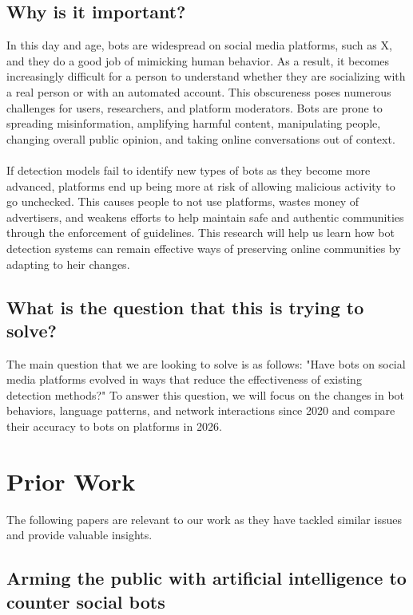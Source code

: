 \subsection{Why is it important?}
    In this day and age, bots are widespread on social media platforms, such as X, and they do a good job of mimicking human behavior. As a result, it becomes increasingly difficult for a person to understand whether they are socializing with a real person or with an automated account. This obscureness poses numerous challenges for users, researchers, and platform moderators. Bots are prone to spreading misinformation, amplifying harmful content, manipulating people, changing overall public opinion, and taking online conversations out of context.
    \\\\
    If detection models fail to identify new types of bots as they become more advanced, platforms end up being more at risk of allowing malicious activity to go unchecked. This causes people to not use platforms, wastes money of advertisers, and weakens efforts to help maintain safe and authentic communities through the enforcement of guidelines. This research will help us learn how bot detection systems can remain effective ways of preserving online communities by adapting to heir changes.

        
\subsection{What is the question that this is trying to solve?}
    The main question that we are looking to solve is as follows: "Have bots on social media platforms evolved in ways that reduce the effectiveness of existing detection methods?" To answer this question, we will focus on the changes in bot behaviors, language patterns, and network interactions since 2020 and compare their accuracy to bots on platforms in 2026.


\section{Prior Work}
The following papers are relevant to our work as they have tackled similar issues and provide valuable insights.

\subsection{Arming the public with artificial intelligence to counter social bots \cite{yang2019arming}}

